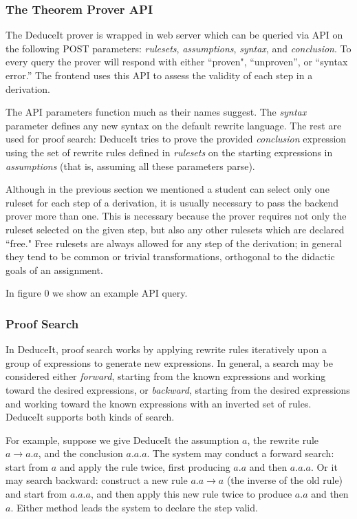 \documentclass{sigchi}
\begin{document}
\subsubsection{The Theorem Prover API}

The DeduceIt prover is wrapped in web server which can be queried via API on the following POST parameters: \textit{rulesets}, \textit{assumptions}, \textit{syntax}, and \textit{conclusion}. To every query the prover will respond with either ``proven", ``unproven'', or ``syntax error.'' The frontend uses this API to assess the validity of each step in a derivation.

The API parameters function much as their names suggest. The \textit{syntax} parameter defines any new syntax on the default rewrite language. The rest are used for proof search: DeduceIt tries to prove the provided \textit{conclusion} expression using the set of rewrite rules defined in \textit{rulesets} on the starting expressions in \textit{assumptions} (that is, assuming all these parameters parse). 

Although in the previous section we mentioned a student can select only one ruleset for each step of a derivation, it is usually necessary to pass the backend prover more than one. This is necessary because the prover requires not only the ruleset selected on the given step, but also any other rulesets which are declared ``free." Free rulesets are always allowed for any step of the derivation; in general they tend to be common or trivial transformations, orthogonal to the didactic goals of an assignment. 

In figure 0 we show an example API query.

\subsubsection{Proof Search}

In DeduceIt, proof search works by applying rewrite rules iteratively upon a group of expressions to generate new expressions. In general, a search may be considered either \textit{forward}, starting from the known expressions and working toward the desired expressions, or \textit{backward}, starting from the desired expressions and working toward the known expressions with an inverted set of rules. DeduceIt supports both kinds of search. 

For example, suppose we give DeduceIt the assumption $a$, the rewrite rule $a \rightarrow a.a$, and the conclusion $a.a.a$. The system may conduct a forward search: start from $a$ and apply the rule twice, first producing $a.a$ and then $a.a.a$. Or it may search backward: construct a new rule $a.a \rightarrow a$ (the inverse of the old rule) and start from $a.a.a$, and then apply this new rule twice to produce $a.a$ and then $a$. Either method leads the system to declare the step valid.
\end{document}
